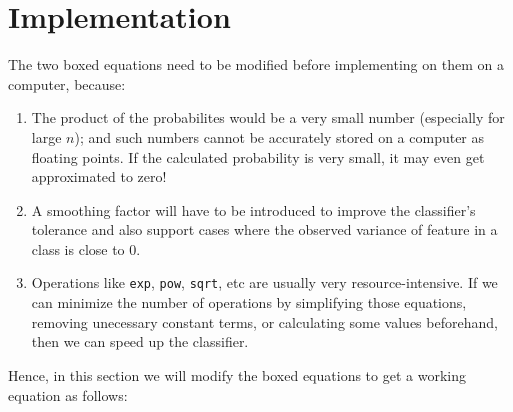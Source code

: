 \section{Implementation}

The two boxed equations need to be modified before implementing on them on a computer, because:
\begin{enumerate}%
	\item The product of the probabilites would be a very small number (especially for large $n$); and such numbers cannot be accurately stored on a computer as floating points. 
	If the calculated probability is very small, it may even get approximated to zero!
	\item A smoothing factor will have to be introduced to improve the classifier's tolerance and also support cases where the observed variance of feature in a class is close to 0.
	\item Operations like \texttt{exp}, \texttt{pow}, \texttt{sqrt}, etc are usually very resource-intensive. If we can minimize the number of operations by simplifying those equations, removing unecessary constant terms, or calculating some values beforehand, then we can speed up the classifier.
\end{enumerate}
Hence, in this section we will modify the boxed equations to get a working equation as follows:

